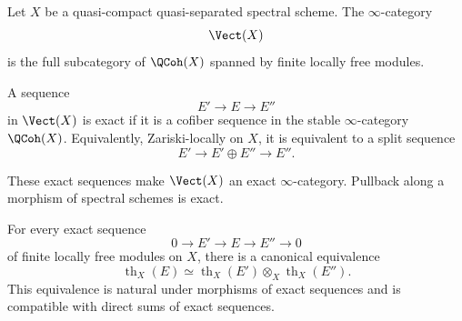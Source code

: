 \begin{definition}
\label{def:exact-structure-Vect}
Let \(X\) be a quasi-compact quasi-separated spectral scheme.  The
\(\infty\)-category
\[
    \Vect(X)
\]
is the full subcategory of \(\QCoh(X)\) spanned by finite locally free
modules.

A sequence
\[
    E'
    \longrightarrow
    E
    \longrightarrow
    E''
\]
in \(\Vect(X)\) is exact if it is a cofiber sequence in the stable
\(\infty\)-category \(\QCoh(X)\).  Equivalently, Zariski-locally on \(X\),
it is equivalent to a split sequence
\[
    E'
    \longrightarrow
    E'\oplus E''
    \longrightarrow
    E''.
\]

These exact sequences make \(\Vect(X)\) an exact \(\infty\)-category.
Pullback along a morphism of spectral schemes is exact.
\end{definition}

\begin{proposition}
\label{prop:thom-exact-additivity}
For every exact sequence
\[
    0\longrightarrow E'
    \longrightarrow E
    \longrightarrow E''
    \longrightarrow0
\]
of finite locally free modules on \(X\), there is a canonical equivalence
\[
    \operatorname{th}_X(E)
    \simeq
    \operatorname{th}_X(E')
    \otimes_X
    \operatorname{th}_X(E'').
\]
This equivalence is natural under morphisms of exact sequences and is
compatible with direct sums of exact sequences.
\end{proposition}

